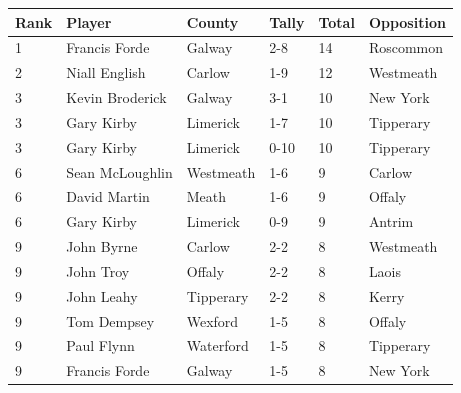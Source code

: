 \documentclass{article}
\begin{document}
\begin{tabular}{llllll}
\toprule
Rank & Player & County & Tally & Total & Opposition \\
\midrule
1 & Francis Forde & Galway & 2-8 & 14 & Roscommon \\
2 & Niall English & Carlow & 1-9 & 12 & Westmeath \\
3 & Kevin Broderick & Galway & 3-1 & 10 & New York \\
3 & Gary Kirby & Limerick & 1-7 & 10 & Tipperary \\
3 & Gary Kirby & Limerick & 0-10 & 10 & Tipperary \\
6 & Sean McLoughlin & Westmeath & 1-6 & 9 & Carlow \\
6 & David Martin & Meath & 1-6 & 9 & Offaly \\
6 & Gary Kirby & Limerick & 0-9 & 9 & Antrim \\
9 & John Byrne & Carlow & 2-2 & 8 & Westmeath \\
9 & John Troy & Offaly & 2-2 & 8 & Laois \\
9 & John Leahy & Tipperary & 2-2 & 8 & Kerry \\
9 & Tom Dempsey & Wexford & 1-5 & 8 & Offaly \\
9 & Paul Flynn & Waterford & 1-5 & 8 & Tipperary \\
9 & Francis Forde & Galway & 1-5 & 8 & New York \\
\bottomrule
\end{tabular}
\end{document}
